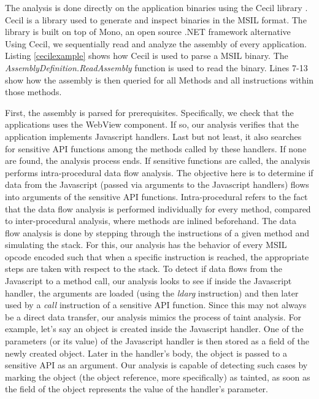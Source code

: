 \documentclass[conference]{IEEEtran}
\begin{document}
The analysis is done directly on the application binaries using the Cecil library \cite{cecil}.
Cecil is a library used to generate and inspect binaries in the MSIL format.
The library is built on top of Mono, an open source .NET framework alternative \cite{mono}
Using Cecil, we sequentially read and analyze the assembly of every application.
Listing \ref{cecilexample} shows how Cecil is used to parse a MSIL binary.
The \textit{AssemblyDefinition.ReadAssembly} function is used to read the binary.
Lines 7-13 show how the assembly is then queried for all Methods and all instructions within those methods.

First, the assembly is parsed for prerequisites.
Specifically, we check that the applications uses the WebView component.
If so, our analysis verifies that the application implements Javascript handlers.
Last but not least, it also searches for sensitive API functions among the methods called by these handlers.
If none are found, the analysis process ends.
If sensitive functions are called, the analysis performs intra-procedural data flow analysis.
The objective here is to determine if data from the Javascript (passed via arguments to the Javascript handlers) flows into arguments of the sensitive API functions.
Intra-procedural refers to the fact that the data flow analysis is performed individually for every method, compared to inter-procedural analysis, where methods are inlined beforehand.
The data flow analysis is done by stepping through the instructions of a given method and simulating the stack.
For this, our analysis has the behavior of every MSIL opcode encoded such that when a specific instruction is reached, the appropriate steps are taken with respect to the stack.
To detect if data flows from the Javascript to a method call, our analysis looks to see if inside the Javascript handler, the arguments are loaded (using the \textit{ldarg} instruction) and then later used by a \textit{call} instruction of a sensitive API function.
Since this may not always be a direct data transfer, our analysis mimics the process of taint analysis.
For example, let's say an object is created inside the Javascript handler.
One of the parameters (or its value) of the Javascript handler is then stored as a field of the newly created object.
Later in the handler's body, the object is passed to a sensitive API as an argument.
Our analysis is capable of detecting such cases by marking the object (the object reference, more specifically) as tainted, as soon as the field of the object represents the value of the handler's parameter.
\end{document}

